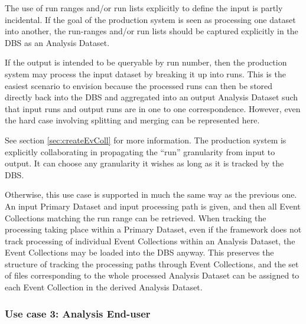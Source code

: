 \documentclass[pdftex]{cmspaper}
\begin{document}
{The use of run ranges and/or run lists explicitly to define the input is 
partly incidental. If the goal of the production system is seen as
processing one dataset into another, the run-ranges and/or run lists 
should be captured explicitly in the DBS as an Analysis Dataset. 

If the output is intended to be queryable by run number, then the
production system may process the input dataset by breaking it up into
runs.  This is the easiest scenario to envision because the processed
runs can then be stored directly back into the DBS and aggregated into an
output Analysis Dataset such that input runs and output runs are in one
to one correspondence.  However, even the hard case involving splitting
and merging can be represented here.

See section \ref{sec:createEvColl} for more information. 
The production system is explicitly collaborating in propagating the
``run'' granularity from input to output.  It can choose any granularity it 
wishes as long as it is tracked by the DBS.  

Otherwise, this use case is supported in much the same way as the previous
one.  An input Primary Dataset and input processing path is given, and
then all Event Collections matching the run range can be retrieved.
When tracking the processing taking place within a Primary Dataset,
even if the framework does not track processing of individual Event
Collections within an Analysis Dataset, the Event Collections may be
loaded into the DBS anyway.  This preserves the structure of tracking
the processing paths through Event Collections, and the set of files
corresponding to the whole processed Analysis Dataset can be assigned
to each Event Collection in the derived Analysis Dataset.

\subsubsection{Use case 3: Analysis End-user}

}
\end{document}
